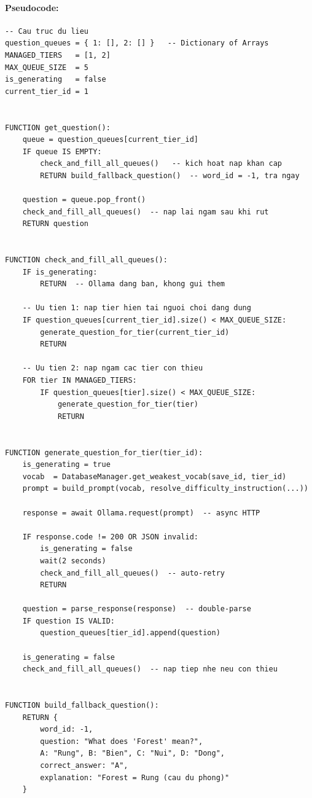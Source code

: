 \paragraph{Pseudocode:}
\begin{lstlisting}
-- Cau truc du lieu
question_queues = { 1: [], 2: [] }   -- Dictionary of Arrays
MANAGED_TIERS   = [1, 2]
MAX_QUEUE_SIZE  = 5
is_generating   = false
current_tier_id = 1


FUNCTION get_question():
    queue = question_queues[current_tier_id]
    IF queue IS EMPTY:
        check_and_fill_all_queues()   -- kich hoat nap khan cap
        RETURN build_fallback_question()  -- word_id = -1, tra ngay

    question = queue.pop_front()
    check_and_fill_all_queues()  -- nap lai ngam sau khi rut
    RETURN question


FUNCTION check_and_fill_all_queues():
    IF is_generating:
        RETURN  -- Ollama dang ban, khong gui them

    -- Uu tien 1: nap tier hien tai nguoi choi dang dung
    IF question_queues[current_tier_id].size() < MAX_QUEUE_SIZE:
        generate_question_for_tier(current_tier_id)
        RETURN

    -- Uu tien 2: nap ngam cac tier con thieu
    FOR tier IN MANAGED_TIERS:
        IF question_queues[tier].size() < MAX_QUEUE_SIZE:
            generate_question_for_tier(tier)
            RETURN


FUNCTION generate_question_for_tier(tier_id):
    is_generating = true
    vocab  = DatabaseManager.get_weakest_vocab(save_id, tier_id)
    prompt = build_prompt(vocab, resolve_difficulty_instruction(...))

    response = await Ollama.request(prompt)  -- async HTTP

    IF response.code != 200 OR JSON invalid:
        is_generating = false
        wait(2 seconds)
        check_and_fill_all_queues()  -- auto-retry
        RETURN

    question = parse_response(response)  -- double-parse
    IF question IS VALID:
        question_queues[tier_id].append(question)

    is_generating = false
    check_and_fill_all_queues()  -- nap tiep nhe neu con thieu


FUNCTION build_fallback_question():
    RETURN {
        word_id: -1,
        question: "What does 'Forest' mean?",
        A: "Rung", B: "Bien", C: "Nui", D: "Dong",
        correct_answer: "A",
        explanation: "Forest = Rung (cau du phong)"
    }
\end{lstlisting}

